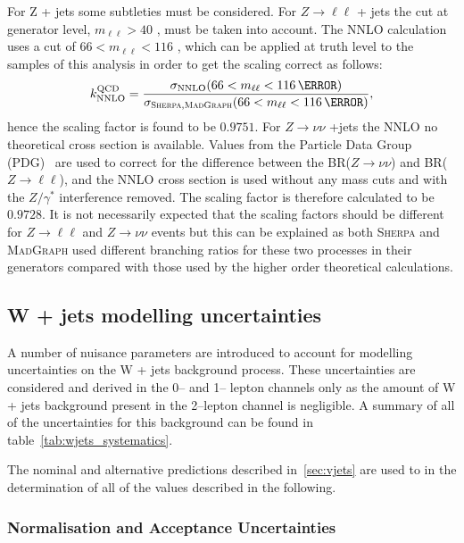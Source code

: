 For Z + jets some subtleties must be considered. For $Z \to \ell\ell$ + jets the
cut at generator level, $m_{\ell\ell}>40$ \GeV, must be taken into account. The
NNLO calculation uses a cut of $66<m_{\ell\ell}<116$ \GeV, which can be applied
at truth level to the samples of this analysis in order to get the scaling
correct as follows:
\begin{equation}
  k_{\text{NNLO}}^{\text{QCD}} = \frac{\sigma_{\text{NNLO}}(66<m_{\ell\ell}<116\,{\GeV})}{\sigma_{\textsc{Sherpa},\textsc{MadGraph}}(66<m_{\ell\ell}<116\,{\GeV})},
  \label{eq:nnlo-vjets-k}
\end{equation}
hence the scaling factor is found to be $0.9751$. For $Z \to \nu\nu$ +jets the
NNLO no theoretical cross section is available. Values from the
Particle Data Group (PDG)~\cite{PDG} are used to correct for the difference
between the BR($Z \to \nu\nu$) and BR($Z \to \ell\ell$), and the NNLO cross
section is used without any mass cuts and with the $Z/\gamma^*$ interference
removed. The scaling factor is therefore calculated to be $0.9728$. It is not
necessarily expected that the scaling factors should be different for $Z \to
\ell \ell$ and $Z \to \nu \nu$ events but this can be explained as both
\textsc{Sherpa} and \textsc{MadGraph} used different branching ratios for these
two processes in their generators compared with those used by the higher order
theoretical calculations.

\subsection{W + jets modelling uncertainties}
A number of nuisance parameters are introduced to account for modelling
uncertainties on the W + jets background process. These uncertainties are
considered and derived in the 0-- and 1-- lepton channels only as the amount of
W + jets background present in the 2--lepton channel is negligible. A summary of
all of the uncertainties for this background can be found in
table~\ref{tab:wjets_systematics}.

The nominal and alternative predictions described in~\ref{sec:vjets} are used to
in the determination of all of the values described in the following. 

\subsubsection{Normalisation and Acceptance Uncertainties}

